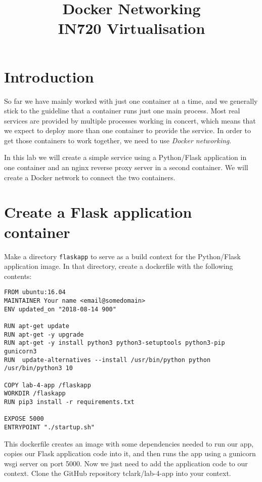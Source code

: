 \documentclass{article}
\begin{document}
\title{Docker Networking\\IN720 Virtualisation}
\date{}
\maketitle

\section*{Introduction}
So far we have mainly worked with just one container at a time, and we generally stick to the guideline that a container runs just one main process. Most real services are provided by multiple processes working in concert, which means that we expect to deploy more than one container to provide the service. In order to get those containers to work together, we need to use \emph{Docker networking}.

In this lab we will create a simple service using a Python/Flask application in one container and an nginx reverse proxy server in a second container. We will create a Docker network to connect the two containers.

\section{Create a Flask application container}
Make a directory \texttt{flaskapp} to serve as a build context for the Python/Flask application image. In that directory, create a dockerfile with the following contents:

\begin{verbatim}
FROM ubuntu:16.04
MAINTAINER Your name <email@somedomain>
ENV updated_on "2018-08-14 900"

RUN apt-get update
RUN apt-get -y upgrade
RUN apt-get -y install python3 python3-setuptools python3-pip gunicorn3
RUN  update-alternatives --install /usr/bin/python python /usr/bin/python3 10

COPY lab-4-app /flaskapp
WORKDIR /flaskapp
RUN pip3 install -r requirements.txt

EXPOSE 5000
ENTRYPOINT "./startup.sh"
\end{verbatim}

This dockerfile creates an image with some dependencies needed to run our app, copies our Flask application code into it, and then runs the app using a gunicorn wsgi server on port 5000. Now we just need to add the application code to our context. Clone the GitHub repository tclark/lab-4-app into your context.
\end{document}
